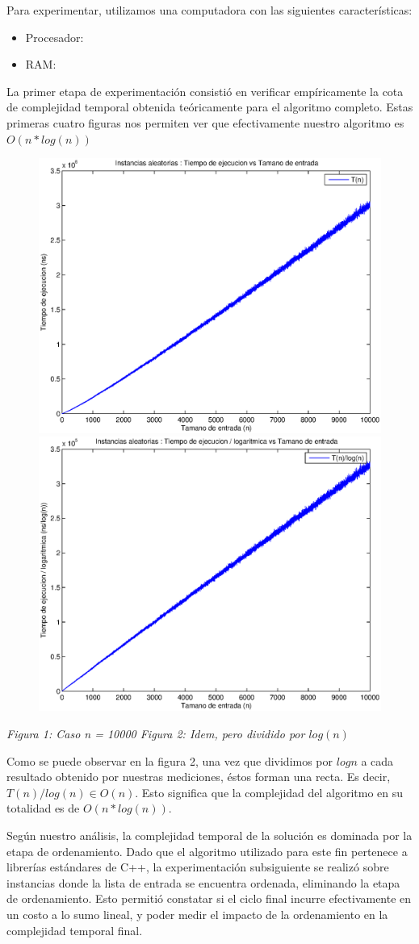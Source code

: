 Para experimentar, utilizamos una computadora con las siguientes características:

\begin{itemize}
 \item Procesador: 
 \item RAM: 
\end{itemize}

La primer etapa de experimentación consistió en verificar empíricamente la cota de complejidad temporal obtenida teóricamente para el algoritmo completo. Estas primeras cuatro figuras nos permiten ver que efectivamente nuestro algoritmo es $O(n * log(n))$

\begin{figure}[H]
    \includegraphics[width=0.5\linewidth]{problema1/graficos/problema1_aleatoria_10000.eps}
    \includegraphics[width=0.5\linewidth]{problema1/graficos/problema1_aleatoria_10000_div_logn.eps}
\end{figure}
\emph{\hspace{2,5cm}Figura 1: Caso n = 10000 \hspace{3cm}Figura 2: Idem, pero dividido por $log(n)$}

Como se puede observar en la figura 2, una vez que dividimos por $log n$ a cada resultado obtenido por nuestras mediciones, éstos forman una recta. Es decir, $T(n)/log(n) \in O(n)$. Esto significa que la complejidad del algoritmo en su totalidad es de $O(n * log(n))$.

Según nuestro análisis, la complejidad temporal de la solución es dominada por la etapa de ordenamiento. Dado que el algoritmo utilizado para este fin pertenece a librerías estándares de C++, la experimentación subsiguiente se realizó sobre instancias donde la lista de entrada se encuentra ordenada, eliminando la etapa de ordenamiento. Esto permitió constatar si el ciclo final incurre efectivamente en un costo a lo sumo lineal, y poder medir el impacto de la ordenamiento en la complejidad temporal final.

